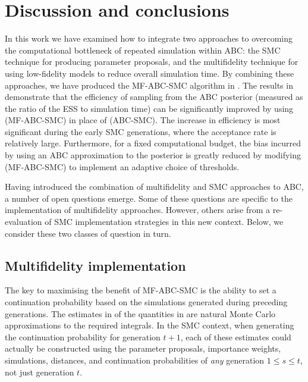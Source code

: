 \documentclass[review]{siamonline190516}
\begin{document}
\section{Discussion and conclusions}
\label{s:Discussion}

In this work we have examined how to integrate two approaches to overcoming the computational bottleneck of repeated simulation within ABC: 
the SMC technique for producing parameter proposals,
and the multifidelity technique for using low-fidelity models to reduce overall simulation time.
By combining these approaches, we have produced the MF-ABC-SMC algorithm in .
The results in  demonstrate that the efficiency of sampling from the ABC posterior (measured as the ratio of the ESS to simulation time) can be significantly improved by using  (MF-ABC-SMC) in place of  (ABC-SMC).
The increase in efficiency is most significant during the early SMC generations, where the acceptance rate is relatively large.
Furthermore, for a fixed computational budget, the bias incurred by using an ABC approximation to the posterior is greatly reduced by modifying  (MF-ABC-SMC) to implement an adaptive choice of thresholds.

Having introduced the combination of multifidelity and SMC approaches to ABC, a number of open questions emerge.
Some of these questions are specific to the implementation of multifidelity approaches.
However, others arise from a re-evaluation of SMC implementation strategies in this new context.
Below, we consider these two classes of question in turn.

\subsection{Multifidelity implementation}

The key to maximising the benefit of MF-ABC-SMC is the ability to set a continuation probability based on the simulations generated during preceding generations.
The estimates in  of the quantities in  are natural Monte Carlo approximations to the required integrals.
In the SMC context, when generating the continuation probability for generation $t+1$, each of these estimates could actually be constructed using the parameter proposals, importance weights, simulations, distances, and continuation probabilities of \emph{any} generation $1 \leq s \leq t$, not just generation $t$.
\end{document}
